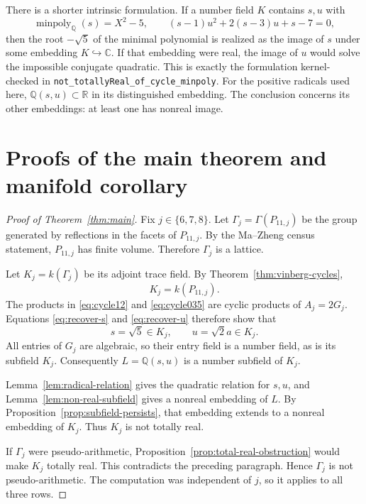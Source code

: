 \documentclass[11pt]{article}
\numberwithin{equation}{section}
\theoremstyle{definition}
\theoremstyle{remark}
\newcommand{\Q}{\mathbb{Q}}
\newcommand{\R}{\mathbb{R}}
\newcommand{\C}{\mathbb{C}}
\newcommand{\minpoly}{\operatorname{minpoly}}
\newcommand{\code}[1]{\texttt{#1}}
\begin{document}
There is a shorter intrinsic formulation.  If a number field \(K\) contains
\(s,u\) with
\[
 \minpoly_\Q(s)=X^2-5,
 \qquad (s-1)u^2+2(s-3)u+s-7=0,
\]
then the root \(-\sqrt5\) of the minimal polynomial is realized as the image
of \(s\) under some embedding \(K\hookrightarrow\C\).  If that embedding
were real, the image of \(u\) would solve the impossible conjugate quadratic.
This is exactly the formulation kernel-checked in
\code{not\_totallyReal\_of\_cycle\_minpoly}.
For the positive radicals used here, \(\Q(s,u)\subset\R\) in its
distinguished embedding.  The conclusion concerns its other embeddings:
at least one has nonreal image.

\section{Proofs of the main theorem and manifold corollary}
\label{sec:main-proof}

\begin{proof}[Proof of Theorem~\ref{thm:main}]
Fix \(j\in\{6,7,8\}\).  Let
\(\Gamma_j=\Gamma(P_{11,j})\) be the group generated by reflections in the
facets of \(P_{11,j}\).  By the Ma--Zheng census statement, \(P_{11,j}\) has
finite volume.  Therefore \(\Gamma_j\) is a lattice.

Let \(K_j=k(\Gamma_j)\) be its adjoint trace field.  By
Theorem~\ref{thm:vinberg-cycles},
\begin{equation}
 K_j=k(P_{11,j}).
\label{eq:vinberg-equality}
\end{equation}
The products in \eqref{eq:cycle12} and \eqref{eq:cycle035} are cyclic
products of \(A_j=2G_j\).  Equations \eqref{eq:recover-s} and
\eqref{eq:recover-u} therefore show that
\[
 s=\sqrt5\in K_j,
 \qquad u=\sqrt2a\in K_j.
\]
All entries of \(G_j\) are algebraic, so their entry field is a number
field, as is its subfield \(K_j\).  Consequently \(L=\Q(s,u)\) is a
number subfield of \(K_j\).

Lemma~\ref{lem:radical-relation} gives the quadratic relation for \(s,u\),
and Lemma~\ref{lem:non-real-subfield} gives a nonreal embedding of \(L\).
By Proposition~\ref{prop:subfield-persists}, that embedding extends to a
nonreal embedding of \(K_j\).  Thus \(K_j\) is not totally real.

If \(\Gamma_j\) were pseudo-arithmetic,
Proposition~\ref{prop:total-real-obstruction} would make \(K_j\) totally
real.  This contradicts the preceding paragraph.  Hence \(\Gamma_j\) is not
pseudo-arithmetic.  The computation was independent of \(j\), so it applies
to all three rows.
\end{proof}
\end{document}
